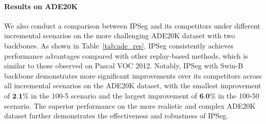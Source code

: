 \begin{table*}[t]
    \caption{Ablation on different label choices to incrementally train the image posterior branch.}
    \centering
    \label{tab:impact_image-level_pseudo_label}
\end{table*}

\paragraph{Results on ADE20K}
We also conduct a comparison between IPSeg and its competitors under different incremental scenarios on the more challenging ADE20K dataset with two backbones. As shown in Table~\ref{tab:ade_res}, IPSeg consistently achieves performance advantages compared with other replay-based methods, which is similar to those observed on Pascal VOC 2012. Notably, IPSeg with Swin-B backbone demonstrates more significant improvements over its competitors across all incremental scenarios on the ADE20K dataset, with the smallest improvement of $\textbf{2.1}\%$ in the 100-5 scenario and the largest improvement of $\textbf{6.0}\%$ in the 100-50 scenario. The superior performance on the more realistic and complex ADE20K dataset further demonstrates the effectiveness and robustness of IPSeg. 

    
